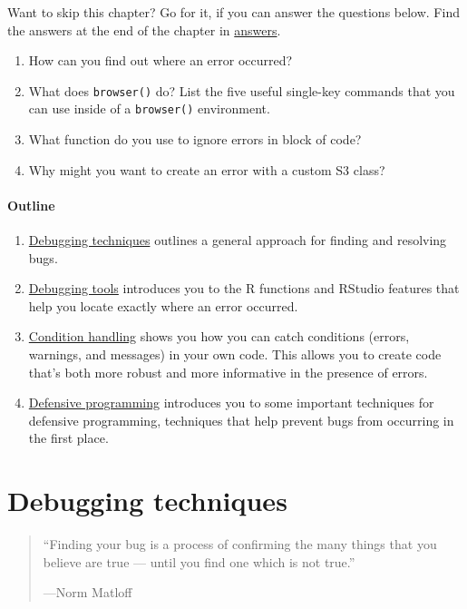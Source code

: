 Want to skip this chapter? Go for it, if you can answer the questions
below. Find the answers at the end of the chapter in
\protect\hyperlink{debugging-answers}{answers}.

\begin{enumerate}
\def\labelenumi{\arabic{enumi}.}
\item
  How can you find out where an error occurred?
\item
  What does \texttt{browser()} do? List the five useful single-key
  commands that you can use inside of a \texttt{browser()} environment.
\item
  What function do you use to ignore errors in block of code?
\item
  Why might you want to create an error with a custom S3 class?
\end{enumerate}

\hypertarget{outline}{%
\paragraph{Outline}\label{outline}}

\begin{enumerate}
\def\labelenumi{\arabic{enumi}.}
\item
  \protect\hyperlink{debugging-techniques}{Debugging techniques}
  outlines a general approach for finding and resolving bugs.
\item
  \protect\hyperlink{debugging-tools}{Debugging tools} introduces you to
  the R functions and RStudio features that help you locate exactly
  where an error occurred.
\item
  \protect\hyperlink{condition-handling}{Condition handling} shows you
  how you can catch conditions (errors, warnings, and messages) in your
  own code. This allows you to create code that's both more robust and
  more informative in the presence of errors.
\item
  \protect\hyperlink{defensive-programming}{Defensive programming}
  introduces you to some important techniques for defensive programming,
  techniques that help prevent bugs from occurring in the first place.
\end{enumerate}

\hypertarget{debugging-techniques}{%
\section{Debugging techniques}\label{debugging-techniques}}

\begin{quote}
``Finding your bug is a process of confirming the many things that you
believe are true --- until you find one which is not true.''

---Norm Matloff
\end{quote}


